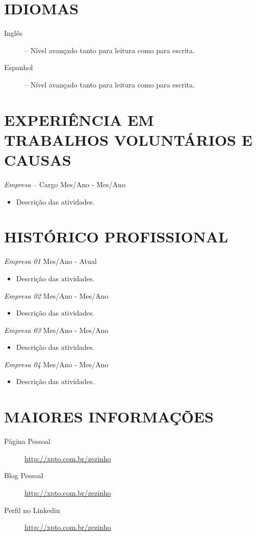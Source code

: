 \documentclass{res}
\begin{document}
\begin{resume}
\section{IDIOMAS} 
\vspace{18pt}
\begin{description}
 \item[Inglês] -- Nível avançado tanto para leitura como para escrita.
 \item[Espanhol] -- Nível avançado tanto para leitura como para escrita.
\end{description}
 
\section{EXPERIÊNCIA EM TRABALHOS VOLUNTÁRIOS E CAUSAS}
\vspace{8pt} 
{\sl Empresa} -- Cargo \hfill Mes/Ano - Mes/Ano
\begin{itemize}
  \item Descrição das atividades.
\end{itemize}

\section{HISTÓRICO PROFISSIONAL} %
\vspace{8pt}

{\sl Empresa 01} \hfill   Mes/Ano - Atual
\begin{itemize}
  \item Descrição das atividades. 
\end{itemize}

{\sl Empresa 02} \hfill   Mes/Ano - Mes/Ano
\begin{itemize}
  \item Descrição das atividades. 
\end{itemize}
 
{\sl Empresa 03} \hfill   Mes/Ano - Mes/Ano
\begin{itemize}
  \item Descrição das atividades. 
\end{itemize}

{\sl Empresa 04} \hfill   Mes/Ano - Mes/Ano
\begin{itemize}
  \item Descrição das atividades. 
\end{itemize}

\section{MAIORES INFORMAÇÕES}
\vspace{18pt} 
\begin{description}
 \item[Página Pessoal] \url{http://xpto.com.br/zezinho}
 \item[Blog Pessoal] \url{http://xpto.com.br/zezinho}
 \item[Perfil no Linkedin] \url{http://xpto.com.br/zezinho}
\end{description}

\end{resume} 
\end{document}
